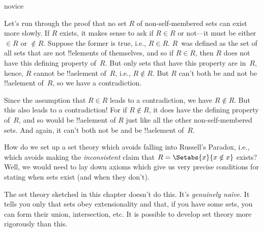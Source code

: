 \documentclass[../../../include/open-logic-section]{subfiles}
\begin{document}
\begin{tagblock}{novice}
\begin{explain}
Let's run through the proof that no set $R$ of non-self-membered sets
can exist more slowly. If $R$ exists, it makes sense to ask if $R \in
R$ or not---it must be either $\in R$ or $\notin R$. Suppose the
former is true, i.e., $R \in R$. $R$~was defined as the set of all
sets that are not !!{element}s of themselves, and so if $R \in R$,
then $R$ does not have this defining property of~$R$. But only sets
that have this property are in~$R$, hence, $R$ cannot be !!a{element}
of~$R$, i.e., $R \notin R$. But $R$ can't both be and not be
!!a{element} of~$R$, so we have a contradiction.

Since the assumption that $R \in R$ leads to a contradiction, we have
$R \notin R$. But this also leads to a contradiction!{} For if $R
\notin R$, it does have the defining property of~$R$, and so would be
!!a{element} of $R$ just like all the other non-self-membered sets.
And again, it can't both not be and be !!a{element} of~$R$.
\end{explain}
\end{tagblock}

\begin{digress}
How do we set up a set theory which avoids falling into
Russell's Paradox, i.e., which avoids making the \emph{inconsistent}
claim that $R = \Setabs{x}{x \notin x}$ exists? Well, we would need to
lay down axioms which give us very precise conditions for stating when
sets exist (and when they don't). 
	
The set theory sketched in this chapter doesn't do this. It's
\emph{genuinely na\"ive}. It tells you only that sets obey
extensionality and that, if you have some sets, you can form their
union, intersection, etc. It is possible to develop set theory more
rigorously than this. 
\end{digress}
\end{document}
